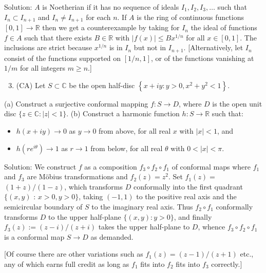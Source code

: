\documentclass[10pt]{article}
\begin{document}
Solution: $A$ is Noetherian if it has no sequence of ideals $I_{1}, I_{2}, I_{3}, \ldots$ such that $I_{n} \subset I_{n+1}$ and $I_{n} \neq I_{n+1}$ for each $n$. If $A$ is the ring of continuous functions $[0,1] \rightarrow \mathbb{R}$ then we get a counterexample by taking for $I_{n}$ the ideal of functions $f \in A$ such that there exists $B \in \mathbb{R}$ with $|f(x)| \leq B x^{1 / n}$ for all $x \in[0,1]$. The inclusions are strict because $x^{1 / n}$ is in $I_{n}$ but not in $I_{n+1}$. [Alternatively, let $I_{n}$ consist of the functions supported on $[1 / n, 1]$, or of the functions vanishing at $1 / m$ for all integers $m \geq n$.]

\begin{enumerate}
  \setcounter{enumi}{2}
  \item (CA) Let $S \subset \mathbb{C}$ be the open half-disc $\left\{x+i y: y>0, x^{2}+y^{2}<1\right\}$.
\end{enumerate}

(a) Construct a surjective conformal mapping $f: S \rightarrow D$, where $D$ is the open unit disc $\{z \in \mathbb{C}:|z|<1\}$.
(b) Construct a harmonic function $h: S \rightarrow \mathbb{R}$ such that:

\begin{itemize}
  \item $h(x+i y) \rightarrow 0$ as $y \rightarrow 0$ from above, for all real $x$ with $|x|<1$, and

  \item $h\left(r e^{i \theta}\right) \rightarrow 1$ as $r \rightarrow 1$ from below, for all real $\theta$ with $0<|x|<\pi$.

\end{itemize}

Solution: We construct $f$ as a composition $f_{3} \circ f_{2} \circ f_{1}$ of conformal maps where $f_{1}$ and $f_{3}$ are Möbius transformations and $f_{2}(z)=z^{2}$. Set $f_{1}(z)=$ $(1+z) /(1-z)$, which transforms $D$ conformally into the first quadrant $\{(x, y)$ : $x>0, y>0\}$, taking $(-1,1)$ to the positive real axis and the semicircular boundary of $S$ to the imaginary real axis. Thus $f_{2} \circ f_{1}$ conformally transforms $D$ to the upper half-plane $\{(x, y): y>0\}$, and finally $f_{3}(z):=(z-i) /(z+i)$ takes the upper half-plane to $D$, whence $f_{3} \circ f_{2} \circ f_{1}$ is a conformal map $S \rightarrow D$ as demanded.

[Of course there are other variations such as $f_{1}(z)=(z-1) /(z+1)$ etc., any of which earns full credit as long as $f_{1}$ fits into $f_{2}$ fits into $f_{3}$ correctly.]
\end{document}
